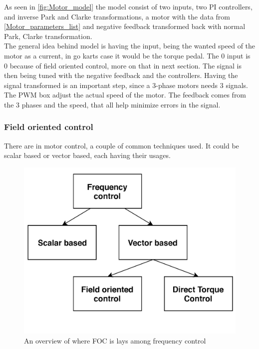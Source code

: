 As seen in \ref{fig:Motor_model} the model consist of two inputs, two PI controllers, and inverse Park and Clarke transformations, a motor with the data from \ref{Motor_parameters_list} and negative feedback transformed back with normal Park, Clarke transformation.\\

The general idea behind model is having the input, being the wanted speed of the motor as a current, in go karts case it would be the torque pedal. The $0$ input is $0$ because of field oriented control, more on that in next section. The signal is then being tuned with the negative feedback and the controllers. Having the signal transformed is an important step, since a 3-phase motors needs 3 signals. The PWM box adjust the actual speed of the motor. The feedback comes from the 3 phases and the speed, that all help minimize errors in the signal. \\

\subsubsection{Field oriented control}
There are in motor control, a couple of common techniques used. It could be scalar based or vector based, each having their usages. \\

\begin{figure} [H]
    \centering
    \includegraphics[scale=0.6]{pictures/control/udklip1.PNG}
    \caption{An overview of where FOC is lays among frequency control}
    \label{fig:my_label}
\end{figure} 

